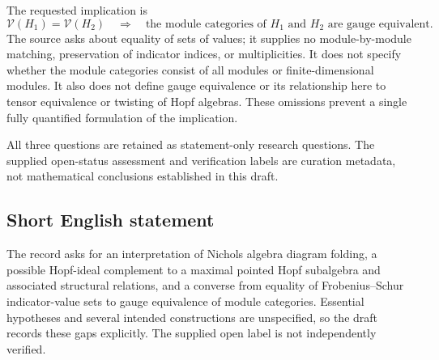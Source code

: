 \documentclass[11pt]{article}
\begin{document}
\begin{enumerate}
The requested implication is
\[
\mathcal V(H_1)=\mathcal V(H_2)
\quad\Longrightarrow\quad
\text{the module categories of }H_1\text{ and }H_2
\text{ are gauge equivalent}.
\]
The source asks about equality of sets of values; it supplies no module-by-module matching, preservation of indicator indices, or multiplicities. It does not specify whether the module categories consist of all modules or finite-dimensional modules. It also does not define gauge equivalence or its relationship here to tensor equivalence or twisting of Hopf algebras. These omissions prevent a single fully quantified formulation of the implication.
\end{enumerate}
All three questions are retained as statement-only research questions. The supplied open-status assessment and verification labels are curation metadata, not mathematical conclusions established in this draft.
\subsection{Short English statement}
The record asks for an interpretation of Nichols algebra diagram folding, a possible Hopf-ideal complement to a maximal pointed Hopf subalgebra and associated structural relations, and a converse from equality of Frobenius--Schur indicator-value sets to gauge equivalence of module categories. Essential hypotheses and several intended constructions are unspecified, so the draft records these gaps explicitly. The supplied open label is not independently verified.
\end{document}
